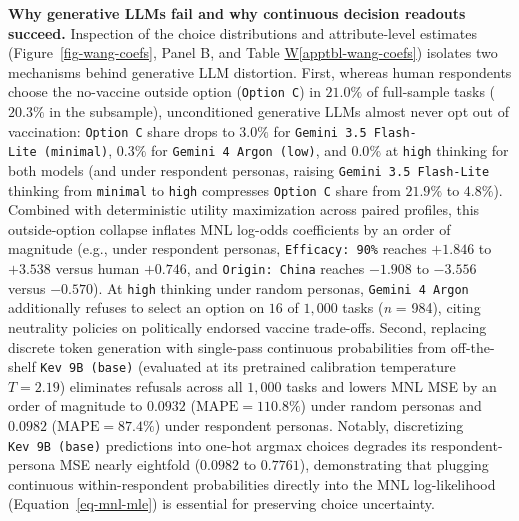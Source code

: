 \documentclass[
  letterpaper,
  DIV=11,
  numbers=noendperiod]{scrartcl}
\newcommand*\quartoapptblref[1]{Table \hyperref[#1]{W\ref{#1}}}
\begin{document}
\textbf{Why generative LLMs fail and why continuous decision readouts
succeed.} Inspection of the choice distributions and attribute-level
estimates (Figure~\ref{fig-wang-coefs}, Panel B, and
\quartoapptblref{apptbl-wang-coefs}) isolates two mechanisms behind
generative LLM distortion. First, whereas human respondents choose the
no-vaccine outside option (\texttt{Option\ C}) in \(21.0\%\) of
full-sample tasks (\(20.3\%\) in the subsample), unconditioned
generative LLMs almost never opt out of vaccination: \texttt{Option\ C}
share drops to \(3.0\%\) for
\texttt{Gemini\ 3.5\ Flash-Lite\ (minimal)}, \(0.3\%\) for
\texttt{Gemini\ 4\ Argon\ (low)}, and \(0.0\%\) at \texttt{high}
thinking for both models (and under respondent personas, raising
\texttt{Gemini\ 3.5\ Flash-Lite} thinking from \texttt{minimal} to
\texttt{high} compresses \texttt{Option\ C} share from \(21.9\%\) to
\(4.8\%\)). Combined with deterministic utility maximization across
paired profiles, this outside-option collapse inflates MNL log-odds
coefficients by an order of magnitude (e.g., under respondent personas,
\texttt{Efficacy:\ 90\%} reaches \(+1.846\) to \(+3.538\) versus human
\(+0.746\), and \texttt{Origin:\ China} reaches \(-1.908\) to \(-3.556\)
versus \(-0.570\)). At \texttt{high} thinking under random personas,
\texttt{Gemini\ 4\ Argon} additionally refuses to select an option on
\(16\) of \(1,000\) tasks (\emph{n} = 984), citing neutrality policies
on politically endorsed vaccine trade-offs. Second, replacing discrete
token generation with single-pass continuous probabilities from
off-the-shelf \texttt{Kev\ 9B\ (base)} (evaluated at its pretrained
calibration temperature \(T = 2.19\)) eliminates refusals across all
\(1,000\) tasks and lowers MNL MSE by an order of magnitude to
\(0.0932\) (\(\mathrm{MAPE} = 110.8\%\)) under random personas and
\(0.0982\) (\(\mathrm{MAPE} = 87.4\%\)) under respondent personas.
Notably, discretizing \texttt{Kev\ 9B\ (base)} predictions into one-hot
argmax choices degrades its respondent-persona MSE nearly eightfold
(\(0.0982\) to \(0.7761\)), demonstrating that plugging continuous
within-respondent probabilities directly into the MNL log-likelihood
(Equation~\ref{eq-mnl-mle}) is essential for preserving choice
uncertainty.
\end{document}
